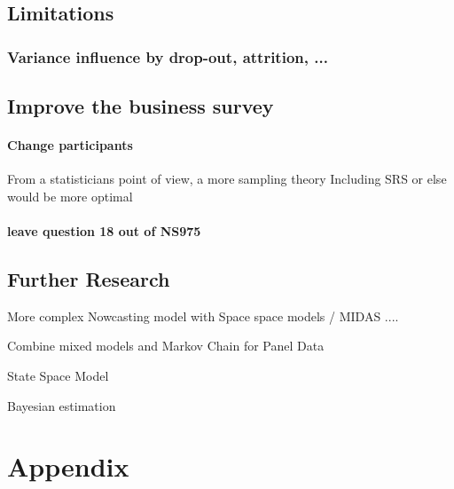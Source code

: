 \documentclass[12pt,a4paper,oneside]{book}
\begin{document}
\section{Limitations}

\subsection*{Variance influence by drop-out, attrition, ...}

\section{Improve the business survey}

\subsubsection*{Change participants}

From a statisticians point of view, a more sampling theory Including SRS or else would be more optimal

\subsubsection{leave question 18 out of NS975}

\section{Further Research}



More complex Nowcasting model with Space space models / MIDAS ....

Combine mixed models and Markov Chain for Panel Data \citep{de_haan-rietdijk_use_2017} 

State Space Model

Bayesian estimation \cite{bialowolski_bayesian_nodate}

\nocite{hlavac_stargazer:_2018}


 


  
\begin{appendix}
  \listoffigures
  \listoftables
\end{appendix}


\chapter*{Appendix}
\end{document}
